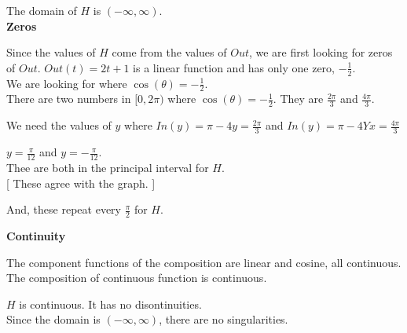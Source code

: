 \documentclass{ximera}
\begin{document}
The domain of $H$ is $(-\infty, \infty)$. \\











\textbf{\textcolor{blue!55!black}{Zeros}}


Since the values of $H$ come from the values of $Out$, we are first looking for zeros of $Out$.  $Out(t) = 2t + 1$ is a linear function and has only one zero, $-\frac{1}{2}$. \\

We are looking for where $\cos(\theta) = -\frac{1}{2}$. \\


There are two numbers in $[0, 2\pi)$ where $\cos(\theta) = -\frac{1}{2}$.  They are $\frac{2\pi}{3}$ and $\frac {4\pi}{3}$.

We need the values of $y$ where $In(y) = \pi - 4y = \frac{2\pi}{3}$ and $In(y) = \pi - 4Yx = \frac{4\pi}{3}$

$y = \frac{\pi}{12}$  and   $y = -\frac{\pi}{12}$.\\

Thee are both in the principal interval for $H$. \\

[ These agree with the graph. ]


And, these repeat every $\frac{\pi}{2}$ for $H$.

















\textbf{\textcolor{blue!55!black}{Continuity}}


The component functions of the composition are linear and cosine, all continuous. \\

The composition of continuous function is continuous.

$H$ is continuous. It has no disontinuities. \\


Since the domain is $(-\infty, \infty)$, there are no singularities. \\
\end{document}
